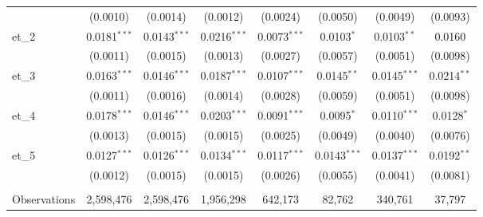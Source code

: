 \begin{tabular}{lccccccc}
                      & (0.0010)        & (0.0014)                      & (0.0012)         & (0.0024)                          & (0.0050)                          & (0.0049)                                        & (0.0093)\\   
   et\_2              & 0.0181$^{***}$  & 0.0143$^{***}$                & 0.0216$^{***}$   & 0.0073$^{***}$                    & 0.0103$^{*}$                      & 0.0103$^{**}$                                   & 0.0160\\   
                      & (0.0011)        & (0.0015)                      & (0.0013)         & (0.0027)                          & (0.0057)                          & (0.0051)                                        & (0.0098)\\   
   et\_3              & 0.0163$^{***}$  & 0.0146$^{***}$                & 0.0187$^{***}$   & 0.0107$^{***}$                    & 0.0145$^{**}$                     & 0.0145$^{***}$                                  & 0.0214$^{**}$\\   
                      & (0.0011)        & (0.0016)                      & (0.0014)         & (0.0028)                          & (0.0059)                          & (0.0051)                                        & (0.0098)\\   
   et\_4              & 0.0178$^{***}$  & 0.0146$^{***}$                & 0.0203$^{***}$   & 0.0091$^{***}$                    & 0.0095$^{*}$                      & 0.0110$^{***}$                                  & 0.0128$^{*}$\\   
                      & (0.0013)        & (0.0015)                      & (0.0015)         & (0.0025)                          & (0.0049)                          & (0.0040)                                        & (0.0076)\\   
   et\_5              & 0.0127$^{***}$  & 0.0126$^{***}$                & 0.0134$^{***}$   & 0.0117$^{***}$                    & 0.0143$^{***}$                    & 0.0137$^{***}$                                  & 0.0192$^{**}$\\   
                      & (0.0012)        & (0.0015)                      & (0.0015)         & (0.0026)                          & (0.0055)                          & (0.0041)                                        & (0.0081)\\   
    \\
   Observations       & 2,598,476       & 2,598,476                     & 1,956,298        & 642,173                           & 82,762                            & 340,761                                         & 37,797\\  

\end{tabular}

